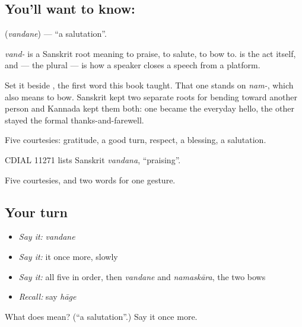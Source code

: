 \subsection*{You'll want to know: }
\textbf{} (\emph{vandane}) — \textquotedblleft{}a salutation\textquotedblright{}.

\emph{vand-} is a Sanskrit root meaning to praise, to salute, to bow to.  is the act itself, and  — the plural — is how a speaker closes a speech from a platform.

Set it beside , the first word this book taught. That one stands on \emph{nam-}, which also means to bow. Sanskrit kept two separate roots for bending toward another person and Kannada kept them both: one became the everyday hello, the other stayed the formal thanks-and-farewell.

Five courtesies: gratitude, a good turn, respect, a blessing, a salutation.

CDIAL 11271 lists Sanskrit \emph{vandana}, \textquotedblleft{}praising\textquotedblright{}.

\begin{grammarlens}[title={What you've built}]
Five courtesies, and two words for one gesture.
\end{grammarlens}

\subsection*{Your turn}
\begin{itemize}
\raggedright
  \item \emph{Say it:} \emph{vandane}
  \item \emph{Say it:} it once more, slowly
  \item \emph{Say it:} all five in order, then \emph{vandane} and \emph{namaskāra}, the two bows
  \item \emph{Recall:} say \emph{hāge}
\end{itemize}

\begin{tcolorbox}[breakable,colback=teal!4,colframe=teal!35!black,title={Before you move on}]
What does  mean? (\textquotedblleft{}a salutation\textquotedblright{}.) Say it once more.
\end{tcolorbox}
